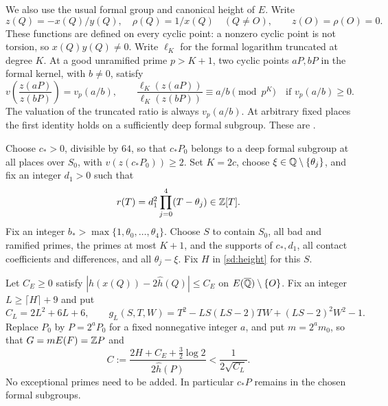 We also use the usual formal group and canonical height of $E$.
Write
\[
 z(Q)=-x(Q)/y(Q),\quad \rho(Q)=1/x(Q)\quad(Q\ne O),
 \qquad z(O)=\rho(O)=0.
\]
These functions are defined on every cyclic point: a nonzero cyclic point
is not torsion, so $x(Q)y(Q)\ne0$. Write $\ell_K$ for the formal logarithm
truncated at degree $K$. At a good unramified prime $p>K+1$, two cyclic
points $aP,bP$ in the formal kernel, with $b\ne0$, satisfy
\begin{equation}\label{sd:formal}
 v\!\left(\frac{z(aP)}{z(bP)}\right)=v_p(a/b),\qquad
 \frac{\ell_K(z(aP))}{\ell_K(z(bP))}\equiv a/b\pmod{p^K}
 \quad\text{if }v_p(a/b)\ge0.
\end{equation}
The valuation of the truncated ratio is always $v_p(a/b)$.
At arbitrary fixed places the first identity holds on a sufficiently deep
formal subgroup. These are \cite[Lemma~2.1 and Section~8.1]{Sun2026}.

Choose $c_*>0$, divisible by $64$, so that $c_*P_0$ belongs to a deep
formal subgroup at all places over $S_0$, with $v(z(c_*P_0))\ge2$.
Set $K=2c$, choose $\xi\in\mathbb Q\setminus\{\theta_j\}$, and fix an integer
$d_1>0$ such that
\[
 r(T)=d_1^2\prod_{j=0}^4(T-\theta_j)\in\mathbb Z[T].
\]
Fix an integer $b_*>\max\{1,\theta_0,\ldots,\theta_4\}$.
Choose $S$ to contain $S_0$, all bad and ramified primes, the primes at most
$K+1$, and the supports of $c_*,d_1$, all contact coefficients and differences,
and all $\theta_j-\xi$. Fix $H$ in \eqref{sd:height} for this $S$.

Let $C_E\ge0$ satisfy
$|h(x(Q))-2\widehat h(Q)|\le C_E$ on $E(\overline{\mathbb Q})\setminus\{O\}$.
Fix an integer $L\ge\lceil H\rceil+9$ and put
\[
 C_L=2L^2+6L+6,\qquad
 g_L(S,T,W)=T^2-LS(LS-2)TW+(LS-2)^2W^2-1.
\]
Replace $P_0$ by $P=2^aP_0$ for a fixed nonnegative integer $a$, and put
$m=2^am_0$, so that $G=mE(F)=\mathbb Z P$ and
\begin{equation}\label{sd:C}
 C:=\frac{2H+C_E+\tfrac32\log2}{2\widehat h(P)}
       <\frac1{2\sqrt{C_L}}.
\end{equation}
No exceptional primes need to be added. In particular $c_*P$ remains in
the chosen formal subgroups.

